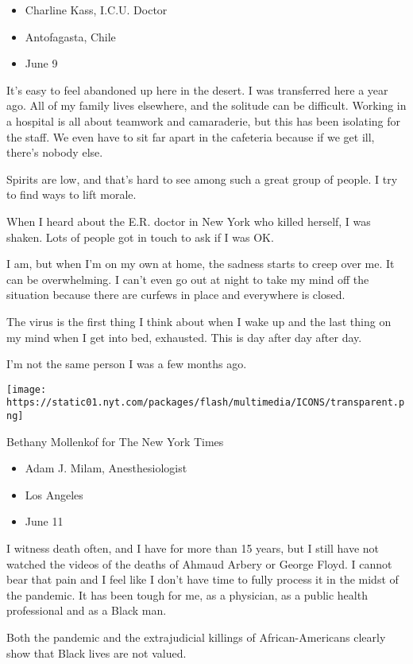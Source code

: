 \begin{itemize}
\tightlist
\item
  Charline Kass, I.C.U. Doctor
\item
  Antofagasta, Chile
\item
  June 9
\end{itemize}

It's easy to feel abandoned up here in the desert. I was transferred
here a year ago. All of my family lives elsewhere, and the solitude can
be difficult. Working in a hospital is all about teamwork and
camaraderie, but this has been isolating for the staff. We even have to
sit far apart in the cafeteria because if we get ill, there's nobody
else.

Spirits are low, and that's hard to see among such a great group of
people. I try to find ways to lift morale.

When I heard about the E.R. doctor in New York who killed herself, I was
shaken. Lots of people got in touch to ask if I was OK.

I am, but when I'm on my own at home, the sadness starts to creep over
me. It can be overwhelming. I can't even go out at night to take my mind
off the situation because there are curfews in place and everywhere is
closed.

The virus is the first thing I think about when I wake up and the last
thing on my mind when I get into bed, exhausted. This is day after day
after day.

I'm not the same person I was a few months ago.

\texttt{[image: https://static01.nyt.com/packages/flash/multimedia/ICONS/transparent.png]}

Bethany Mollenkof for The New York Times

\begin{itemize}
\tightlist
\item
  Adam J. Milam, Anesthesiologist
\item
  Los Angeles
\item
  June 11
\end{itemize}

I witness death often, and I have for more than 15 years, but I still
have not watched the videos of the deaths of Ahmaud Arbery or George
Floyd. I cannot bear that pain and I feel like I don't have time to
fully process it in the midst of the pandemic. It has been tough for me,
as a physician, as a public health professional and as a Black man.

Both the pandemic and the extrajudicial killings of African-Americans
clearly show that Black lives are not valued.


